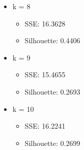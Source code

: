 \documentclass{article}
\begin{document}
\begin{itemize}
    \item{k = 8}
        \begin{itemize}
            \item SSE: 16.3628
            \item Silhouette: 0.4406
        \end{itemize}
        
    \item{k = 9}
        \begin{itemize}
            \item SSE: 15.4655
            \item Silhouette:  0.2693
        \end{itemize}
        
    \item{k = 10}
        \begin{itemize}
            \item SSE: 16.2241
            \item Silhouette: 0.2699
        \end{itemize}
\end{itemize}
\end{document}
